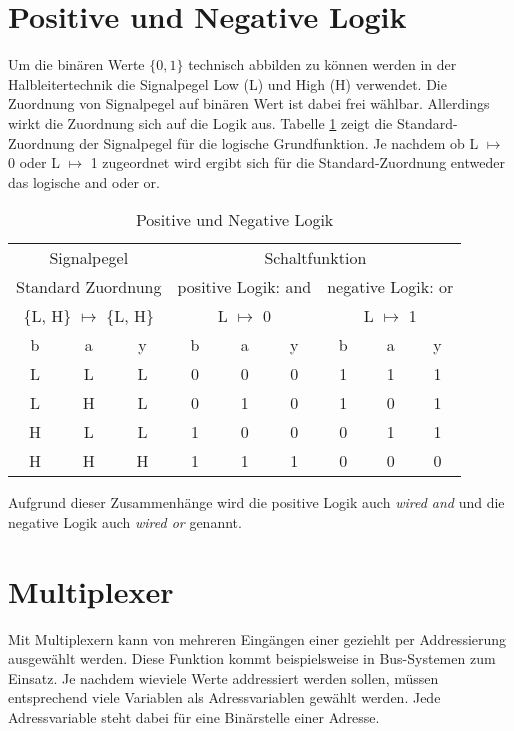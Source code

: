 \section{Positive und Negative Logik}
Um die binären Werte $\{0, 1\}$ technisch abbilden zu können werden in der Halbleitertechnik die Signalpegel Low (L) und High (H) verwendet. Die Zuordnung von Signalpegel auf binären Wert ist dabei frei wählbar. Allerdings wirkt die Zuordnung sich auf die Logik aus. Tabelle \ref{posNegLogik} zeigt die Standard-Zuordnung der Signalpegel für die logische Grundfunktion. Je nachdem ob L $\mapsto$ 0 oder L $\mapsto$ 1 zugeordnet wird ergibt sich für die Standard-Zuordnung entweder das logische {\sc and} oder {\sc or}.
\begin{table}[h]
\centering
\begin{tabular}{*{2}{cc|c||}cc|c}
\multicolumn{3}{c||}{Signalpegel} & \multicolumn{6}{c}{Schaltfunktion}\\
\multicolumn{3}{c||}{Standard Zuordnung} & \multicolumn{3}{c||}{positive Logik: {\sc and}} & \multicolumn{3}{c}{negative Logik: {\sc or}}\\
\multicolumn{3}{c||}{\{L, H\} $\mapsto$ \{L, H\}} & \multicolumn{3}{c||}{L $\mapsto$ 0} & \multicolumn{3}{c}{L $\mapsto$ 1}\\ \hline
b & a & y & b & a & y & b & a & y \\ \hline
L & L & L & 0 & 0 & 0 & 1 & 1 & 1 \\
L & H & L & 0 & 1 & 0 & 1 & 0 & 1 \\
H & L & L & 1 & 0 & 0 & 0 & 1 & 1 \\
H & H & H & 1 & 1 & 1 & 0 & 0 & 0 \\
\end{tabular}
\caption{Positive und Negative Logik}
\label{posNegLogik}
\end{table}

Aufgrund dieser Zusammenhänge wird die positive Logik auch {\sl wired {\sc and}} und die negative Logik auch {\sl wired {\sc or}} genannt.  
  
\section{Multiplexer}  
Mit Multiplexern kann von mehreren Eingängen einer geziehlt per Addressierung ausgewählt werden. Diese Funktion kommt beispielsweise in Bus-Systemen zum Einsatz. Je nachdem wieviele Werte addressiert werden sollen, müssen entsprechend viele Variablen als Adressvariablen gewählt werden. Jede Adressvariable steht dabei für eine Binärstelle einer Adresse. 


